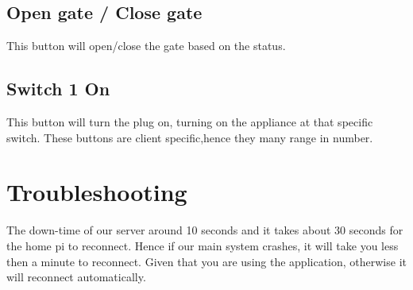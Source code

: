 \documentclass[a4paper,12pt]{article}
\begin{document}
	 \subsection{Open gate / Close gate}
	 This button will open/close the gate based on the status.
	\subsection{Switch 1 On}
	This button will turn the plug on, turning on the appliance at that specific switch.\newline\newline
	These buttons are client specific,hence they many range in number.
	
	\section{Troubleshooting}
	The down-time of our server around 10 seconds and it takes about 30 seconds for the home pi to reconnect. Hence if our main system crashes, it will take you less then a minute to reconnect. Given that you are using the application, otherwise it will reconnect automatically.
\end{document}

